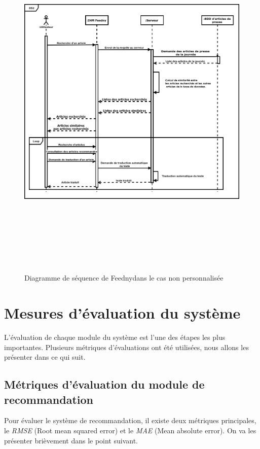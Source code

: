\begin{figure}[H]
    \centering
    \includegraphics[height=500pt,width=425pt]{img/chapter3/diagseqnonperso.png}
    \caption{Diagramme de séquence de \textquotedbl Feedny\textquotedbl dans le cas non personnalisée }
\end{figure}

\section{Mesures d'évaluation du système}
L'évaluation de chaque module du système est l'une des étapes les plus importantes. Plusieurs métriques d'évaluations ont été utilisées, nous allons les présenter dans ce qui suit.

    \subsection{Métriques d'évaluation du module de recommandation}
    Pour évaluer le système de recommandation, il existe deux métriques principales, le \emph{RMSE} (Root mean squared error) et le \emph{MAE} (Mean absolute error). On va les présenter brièvement dans le point suivant. 

